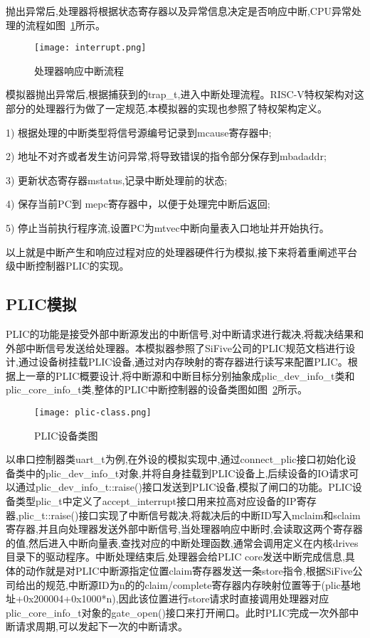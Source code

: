抛出异常后,处理器将根据状态寄存器以及异常信息决定是否响应中断,CPU异常处理的流程如图~\ref{fig:interrupt}所示。
\begin{figure}[H]
    \centering
    \texttt{[image: interrupt.png]}
    \caption{处理器响应中断流程}
    \label{fig:interrupt}
\end{figure}

模拟器抛出异常后,根据捕获到的trap\_t,进入中断处理流程。RISC-V特权架构对这部分的处理器行为做了一定规范,本模拟器的实现也参照了特权架构定义。


1) 根据处理的中断类型将信号源编号记录到mcause寄存器中;


2) 地址不对齐或者发生访问异常,将导致错误的指令部分保存到mbadaddr;


3) 更新状态寄存器mstatus,记录中断处理前的状态;


4) 保存当前PC到 mepc寄存器中，以便于处理完中断后返回;


5) 停止当前执行程序流,设置PC为mtvec中断向量表入口地址并开始执行。


以上就是中断产生和响应过程对应的处理器硬件行为模拟,接下来将着重阐述平台级中断控制器PLIC的实现。


\subsection{PLIC模拟}

PLIC的功能是接受外部中断源发出的中断信号,对中断请求进行裁决,将裁决结果和外部中断信号发送给处理器。本模拟器参照了SiFive公司的PLIC规范文档进行设计,通过设备树挂载PLIC设备,通过对内存映射的寄存器进行读写来配置PLIC。根据上一章的PLIC概要设计,将中断源和中断目标分别抽象成plic\_dev\_info\_t类和plic\_core\_info\_t类,整体的PLIC中断控制器的设备类图如图~\ref{fig:plic-class}所示。
\begin{figure}[H]
    \centering
    \texttt{[image: plic-class.png]}
    \caption{PLIC设备类图}
    \label{fig:plic-class}
\end{figure}
以串口控制器类uart\_t为例,在外设的模拟实现中,通过connect\_plic接口初始化设备类中的plic\_dev\_info\_t对象,并将自身挂载到PLIC设备上,后续设备的IO请求可以通过plic\_dev\_info\_t::raise()接口发送到PLIC设备,模拟了闸口的功能。PLIC设备类型plic\_t中定义了accept\_interrupt接口用来拉高对应设备的IP寄存器,plic\_t::raise()接口实现了中断信号裁决,将裁决后的中断ID写入mclaim和sclaim寄存器,并且向处理器发送外部中断信号,当处理器响应中断时,会读取这两个寄存器的值,然后进入中断向量表,查找对应的中断处理函数,通常会调用定义在内核drives目录下的驱动程序。中断处理结束后,处理器会给PLIC core发送中断完成信息,具体的动作就是对PLIC中断源指定位置claim寄存器发送一条store指令,根据SiFive公司给出的规范,中断源ID为n的的claim/complete寄存器内存映射位置等于(plic基地址+0x200004+0x1000*n),因此该位置进行store请求时直接调用处理器对应plic\_core\_info\_t对象的gate\_open()接口来打开闸口。此时PLIC完成一次外部中断请求周期,可以发起下一次的中断请求。




